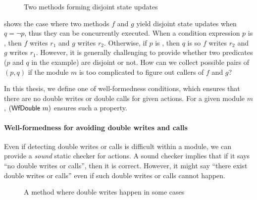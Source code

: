 \begin{figure}[h]
  \caption{Two methods forming disjoint state updates}
  \label{ex-two-methods-disjoint}
\end{figure}

 shows the case where two methods $f$
and $g$ yield disjoint state updates when $q = \neg p$, thus they can
be concurrently executed. When a condition expression $p$ is \btrue{},
then $f$ writes $r_1$ and $g$ writes $r_2$. Otherwise, if $p$ is
\bfalse{}, then $q$ is \btrue{} so $f$ writes $r_2$ and $g$ writes
$r_1$. However, it is generally challenging to provide whether two
predicates ($p$ and $q$ in the example) are disjoint or not. How can
we collect possible pairs of $(p, q)$ if the module $m$ is too
complicated to figure out callers of $f$ and $g$?

In this thesis, we define one of well-formedness conditions, which
ensures that there are no double writes or double calls for given
actions. For a given module $m$, $(\textsf{WfDouble}\ m)$ ensures such a
property.

\paragraph{Well-formedness for avoiding double writes and calls}

Even if detecting double writes or calls is difficult within a module,
we can provide a \emph{sound} static checker for actions. A sound
checker implies that if it says ``no double writes or calls'', then it
is correct. However, it might say ``there exist double writes or
calls'' even if such double writes or calls cannot happen.

\begin{figure}[h]
  \caption{A method where double writes happen in some cases}
  \label{ex-maybe-double-writes}
\end{figure}

